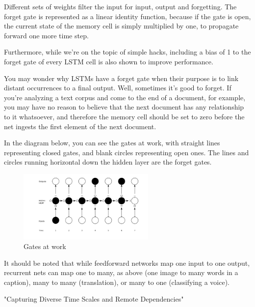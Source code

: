 {Different sets of weights filter the input for input, output and forgetting. The forget gate is represented as a linear identity function, because if the gate is open, the current state of the memory cell is simply multiplied by one, to propagate forward one more time step.

Furthermore, while we’re on the topic of simple hacks, including a bias of 1 to the forget gate of every LSTM cell is also shown to improve performance.

You may wonder why LSTMs have a forget gate when their purpose is to link distant occurrences to a final output. Well, sometimes it’s good to forget. If you’re analyzing a text corpus and come to the end of a document, for example, you may have no reason to believe that the next document has any relationship to it whatsoever, and therefore the memory cell should be set to zero before the net ingests the first element of the next document.

In the diagram below, you can see the gates at work, with straight lines representing closed gates, and blank circles representing open ones. The lines and circles running horizontal down the hidden layer are the forget gates.

\renewcommand{\figurename}{Abb.}
\begin{figure}[htp]
\centering
\includegraphics[width=0.60\textwidth]{pictures/gates_lstm.png}
\caption[Gates at work]{Gates at work\protect\footnotemark}
\end{figure}

It should be noted that while feedforward networks map one input to one output, recurrent nets can map one to many, as above (one image to many words in a caption), many to many (translation), or many to one (classifying a voice).

"Capturing Diverse Time Scales and Remote Dependencies"

}
